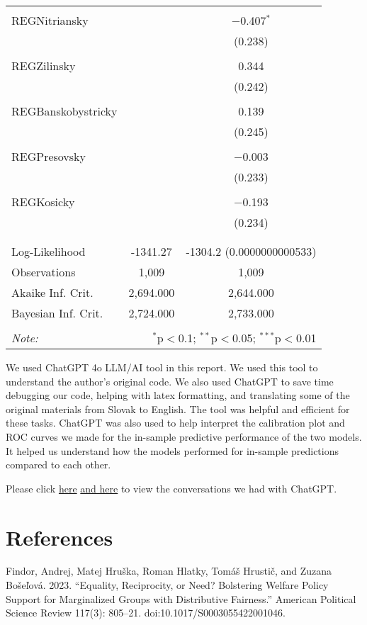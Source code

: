 \documentclass[titlepage]{article}
\begin{document}
\begin{table}[!htbp]
{\begin{tabular}{@{\extracolsep{5pt}}lcc}
  & & \\ 
 REGNitriansky &  & $-$0.407$^{*}$ \\ 
  &  & (0.238) \\ 
  & & \\ 
 REGZilinsky &  & 0.344 \\ 
  &  & (0.242) \\ 
  & & \\ 
 REGBanskobystricky &  & 0.139 \\ 
  &  & (0.245) \\ 
  & & \\ 
 REGPresovsky &  & $-$0.003 \\ 
  &  & (0.233) \\ 
  & & \\ 
 REGKosicky &  & $-$0.193 \\ 
  &  & (0.234) \\ 
  & & \\ 
\hline \\[-1.8ex] 
Log-Likelihood & -1341.27 & -1304.2 (0.0000000000533) \\ 
Observations & 1,009 & 1,009 \\ 
Akaike Inf. Crit. & 2,694.000 & 2,644.000 \\ 
Bayesian Inf. Crit. & 2,724.000 & 2,733.000 \\ 
\hline 
\hline \\[-1.8ex] 
\textit{Note:}  & \multicolumn{2}{r}{$^{*}$p$<$0.1; $^{**}$p$<$0.05; $^{***}$p$<$0.01} \\ 
\end{tabular}}
\end{table} 

\justify
We used ChatGPT 4o LLM/AI tool in this report. We used this tool to understand the author's original code. We also used ChatGPT to save time debugging our code, helping with latex formatting, and translating some of the original materials from Slovak to English. The tool was helpful and efficient for these tasks. ChatGPT was also used to help interpret the calibration plot and ROC curves we made for the in-sample predictive performance of the two models. It helped us understand how the models performed for in-sample predictions compared to each other.

\justify
Please click \href{https://chatgpt.com/share/67d47a4f-e0d8-8004-8a43-8cba73891e43}{here} \href{https://chatgpt.com/share/67d4a1ab-f9f4-8012-8bf6-c9248ddeb44c}{and here} to view the conversations we had with ChatGPT.

\section*{References}

Findor, Andrej, Matej Hruška, Roman Hlatky, Tomáš Hrustič, and Zuzana Bošeľová. 2023. “Equality, Reciprocity, or Need? Bolstering Welfare Policy Support for Marginalized Groups with Distributive Fairness.” American Political Science Review 117(3): 805–21. doi:10.1017/S0003055422001046.
\end{document}
